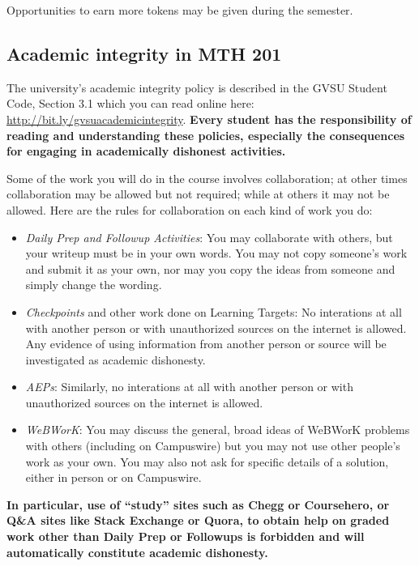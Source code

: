 \documentclass[]{article}
\providecommand{\tightlist}{%
  \setlength{\itemsep}{0pt}\setlength{\parskip}{0pt}}
\begin{document}
Opportunities to earn more tokens may be given during the semester.

\hypertarget{academic-integrity-in-mth-201}{%
\subsection{Academic integrity in MTH
201}\label{academic-integrity-in-mth-201}}

The university's academic integrity policy is described in the GVSU
Student Code, Section 3.1 which you can read online here:
\url{http://bit.ly/gvsuacademicintegrity}. \textbf{Every student has the
responsibility of reading and understanding these policies, especially
the consequences for engaging in academically dishonest activities.}

Some of the work you will do in the course involves collaboration; at
other times collaboration may be allowed but not required; while at
others it may not be allowed. Here are the rules for collaboration on
each kind of work you do:

\begin{itemize}
\tightlist
\item
  \emph{Daily Prep and Followup Activities}: You may collaborate with
  others, but your writeup must be in your own words. You may not copy
  someone's work and submit it as your own, nor may you copy the ideas
  from someone and simply change the wording.
\item
  \emph{Checkpoints} and other work done on Learning Targets: No
  interations at all with another person or with unauthorized sources on
  the internet is allowed. Any evidence of using information from
  another person or source will be investigated as academic dishonesty.
\item
  \emph{AEPs}: Similarly, no interations at all with another person or
  with unauthorized sources on the internet is allowed.
\item
  \emph{WeBWorK}: You may discuss the general, broad ideas of WeBWorK
  problems with others (including on Campuswire) but you may not use
  other people's work as your own. You may also not ask for specific
  details of a solution, either in person or on Campuswire.
\end{itemize}

\textbf{In particular, use of ``study'' sites such as Chegg or
Coursehero, or Q\&A sites like Stack Exchange or Quora, to obtain help
on graded work other than Daily Prep or Followups is forbidden and will
automatically constitute academic dishonesty.}
\end{document}
